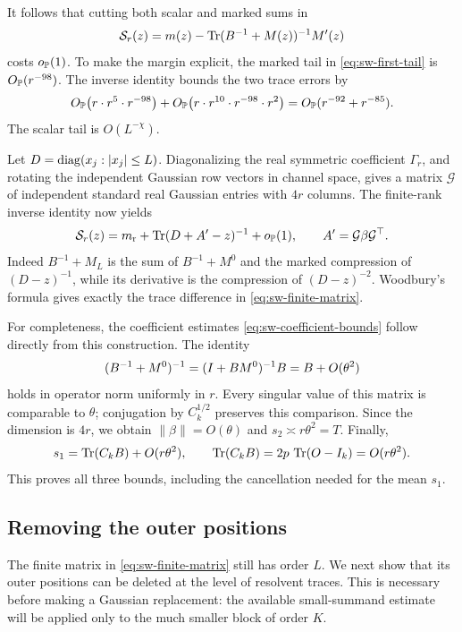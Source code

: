 It follows that cutting both scalar and marked sums in
\[
 \mathcal S_r(z)=m(z)-\operatorname{Tr}(B^{-1}+M(z))^{-1}M'(z)
\]
costs \(o_{\mathbb P}(1)\). To make the margin explicit, the marked tail in
\eqref{eq:sw-first-tail} is \(O_{\mathbb P}(r^{-98})\). The inverse identity bounds
the two trace errors by
\[
 O_{\mathbb P}\bigl(r\cdot r^5\cdot r^{-98}\bigr)
 +O_{\mathbb P}\bigl(r\cdot r^{10}\cdot r^{-98}\cdot r^2\bigr)
 =O_{\mathbb P}(r^{-92}+r^{-85}).
\]
The scalar tail is \(O(L^{-\chi})\).

Let \(D=\operatorname{diag}(x_j:|x_j|\le L)\).
Diagonalizing the real symmetric coefficient \(\Gamma_r\), and rotating
the independent Gaussian row vectors in channel space, gives a matrix
\(\mathcal G\) of independent standard real Gaussian entries with \(4r\)
columns. The finite-rank inverse identity now yields
\begin{equation}\label{eq:sw-finite-matrix}
 \mathcal S_r(z)
 =m_{\rm r}+\operatorname{Tr}(D+A'-z)^{-1}+o_{\mathbb P}(1),
 \qquad A'=\mathcal G\beta\mathcal G^\top .
\end{equation}
Indeed \(B^{-1}+M_L\) is the sum of \(B^{-1}+M^0\) and the marked
compression of \((D-z)^{-1}\), while its derivative is the compression of
\((D-z)^{-2}\). Woodbury's formula gives exactly the trace difference
in \eqref{eq:sw-finite-matrix}.

For completeness, the coefficient estimates
\eqref{eq:sw-coefficient-bounds} follow directly from this construction.
The identity
\[
 (B^{-1}+M^0)^{-1}=(I+BM^0)^{-1}B=B+O(\theta^2)
\]
holds in operator norm uniformly in \(r\). Every singular value of this
matrix is comparable to \(\theta\); conjugation by \(C_k^{1/2}\) preserves
this comparison. Since the dimension is \(4r\), we obtain
\(\|\beta\|=O(\theta)\) and \(s_2\asymp r\theta^2=T\). Finally,
\[
 s_1=\operatorname{Tr}(C_kB)+O(r\theta^2),\qquad
 \operatorname{Tr}(C_kB)=2p\,\operatorname{Tr}(O-I_k)=O(r\theta^2).
\]
This proves all three bounds, including the cancellation needed for
the mean \(s_1\).

\subsection{Removing the outer positions}

The finite matrix in \eqref{eq:sw-finite-matrix} still has order \(L\).
We next show that its outer positions can be deleted at the level of
resolvent traces. This is necessary before making a Gaussian replacement:
the available small-summand estimate will be applied only to the much
smaller block of order \(K\).


